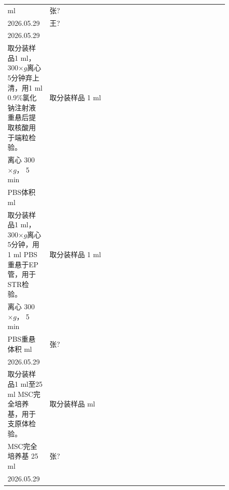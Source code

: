 \documentclass[UTF8,10pt,a4paper,fontset=fandol]{ctexart}
\newcommand{\fieldvalue}[1]{#1}
\newcommand{\handwritten}[1]{#1}
\begin{document}
\begin{tabular}{|p{0.13\linewidth}|p{0.30\linewidth}|p{0.13\linewidth}|p{0.31\linewidth}|}
\underline{\hspace{1cm}} ml
&
\fieldvalue{\handwritten{张?}}\\
\fieldvalue{\handwritten{2026.05.29}}
&
\fieldvalue{\handwritten{王?}}\\
\fieldvalue{\handwritten{2026.05.29}}
\\ \hline
取分装样品1 ml，300$\times g$离心5分钟弃上清，用1 ml 0.9\%氯化钠注射液重悬后提取核酸用于端粒检验。 &
取分装样品%
\fieldvalue{\handwritten{1}} ml\\
离心%
\fieldvalue{\handwritten{300}} $\times g$，%
\fieldvalue{\handwritten{5}} min\\
PBS体积%
\underline{\hspace{1cm}} ml
&
&
\\ \hline
取分装样品1 ml，300$\times g$离心5分钟，用1 ml PBS重悬于EP管，用于STR检验。 &
取分装样品%
\fieldvalue{\handwritten{1}} ml\\
离心%
\fieldvalue{\handwritten{300}} $\times g$，%
\fieldvalue{\handwritten{5}} min\\
PBS重悬体积%
\underline{\hspace{1cm}} ml
&
\fieldvalue{\handwritten{张?}}\\
\fieldvalue{\handwritten{2026.05.29}}
&
\\ \hline
取分装样品1 ml至25 ml MSC完全培养基，用于支原体检验。 &
取分装样品%
\underline{\hspace{1cm}} ml\\
MSC完全培养基%
\fieldvalue{\handwritten{25}} ml
&
\fieldvalue{\handwritten{张?}}\\
\fieldvalue{\handwritten{2026.05.29}}
&
\\ \hline
\end{tabular}
\end{document}
